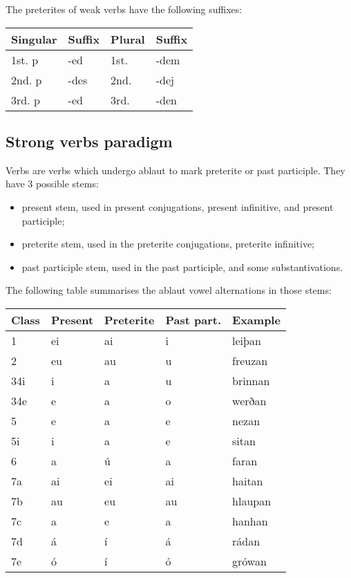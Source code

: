 The preterites of weak verbs have the following suffixes:

\begin{center}
\begin{tabular}{llll}
Singular & Suffix & Plural & Suffix \\
\hline
1st. p & -ed  & 1st. & -dem \\
2nd. p & -des & 2nd. & -dej \\
3rd. p & -ed  & 3rd. & -den \\
\end{tabular}
\end{center}

\subsection{Strong verbs paradigm}

Verbs are verbs which undergo ablaut to mark preterite or past participle.  They have 3 possible stems:

\begin{itemize}
\item present stem, used in present conjugations, present infinitive, and present participle;
\item preterite stem, used in the preterite conjugations, preterite infinitive;
\item past participle stem, used in the past participle, and some substantivations.
\end{itemize}

The following table summarises the ablaut vowel alternations in those stems:

\begin{center}
\begin{tabular}{lllll}
Class & Present & Preterite & Past part. & Example \\
\hline
1   & ei & ai & i  & leiþan  \\
2   & eu & au & u  & freuzan \\
34i & i  & a  & u  & brinnan \\
34e & e  & a  & o  & werðan  \\
5   & e  & a  & e  & nezan   \\
5i  & i  & a  & e  & sitan   \\
6   & a  & ú  & a  & faran   \\
7a  & ai & ei & ai & haitan  \\
7b  & au & eu & au & hlaupan \\
7c  & a  & e  & a  & hanhan  \\
7d  & á  & í  & á  & rádan   \\
7e  & ó  & í  & ó  & grówan  \\
\end{tabular}
\end{center}


